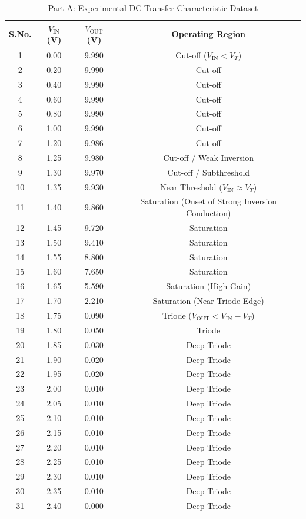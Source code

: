 \documentclass[11pt,a4paper]{article}
\begin{document}
\begin{table}[H]
\centering
\caption{Part A: Experimental DC Transfer Characteristic Dataset}\label{tab:part_a_readings}
\begin{tabular}{cccc}
\toprule
\textbf{S.No.} & \textbf{$V_{\text{IN}}$ (V)} & \textbf{$V_{\text{OUT}}$ (V)} & \textbf{Operating Region} \\
\midrule
1  & 0.00 & 9.990 & Cut-off ($V_{\text{IN}} < V_T$) \\
2  & 0.20 & 9.990 & Cut-off \\
3  & 0.40 & 9.990 & Cut-off \\
4  & 0.60 & 9.990 & Cut-off \\
5  & 0.80 & 9.990 & Cut-off \\
6  & 1.00 & 9.990 & Cut-off \\
7  & 1.20 & 9.986 & Cut-off \\
8  & 1.25 & 9.980 & Cut-off / Weak Inversion \\
9  & 1.30 & 9.970 & Cut-off / Subthreshold \\
10 & 1.35 & 9.930 & Near Threshold ($V_{\text{IN}} \approx V_T$) \\
\midrule
11 & 1.40 & 9.860 & Saturation (Onset of Strong Inversion Conduction) \\
12 & 1.45 & 9.720 & Saturation \\
13 & 1.50 & 9.410 & Saturation \\
14 & 1.55 & 8.800 & Saturation \\
15 & 1.60 & 7.650 & Saturation \\
16 & 1.65 & 5.590 & Saturation (High Gain) \\
17 & 1.70 & 2.210 & Saturation (Near Triode Edge) \\
\midrule
18 & 1.75 & 0.090 & Triode ($V_{\text{OUT}} < V_{\text{IN}} - V_T$) \\
19 & 1.80 & 0.050 & Triode \\
20 & 1.85 & 0.030 & Deep Triode \\
21 & 1.90 & 0.020 & Deep Triode \\
22 & 1.95 & 0.020 & Deep Triode \\
23 & 2.00 & 0.010 & Deep Triode \\
24 & 2.05 & 0.010 & Deep Triode \\
25 & 2.10 & 0.010 & Deep Triode \\
26 & 2.15 & 0.010 & Deep Triode \\
27 & 2.20 & 0.010 & Deep Triode \\
28 & 2.25 & 0.010 & Deep Triode \\
29 & 2.30 & 0.010 & Deep Triode \\
30 & 2.35 & 0.010 & Deep Triode \\
31 & 2.40 & 0.000 & Deep Triode \\
\bottomrule
\end{tabular}
\end{table} 
\end{document}
